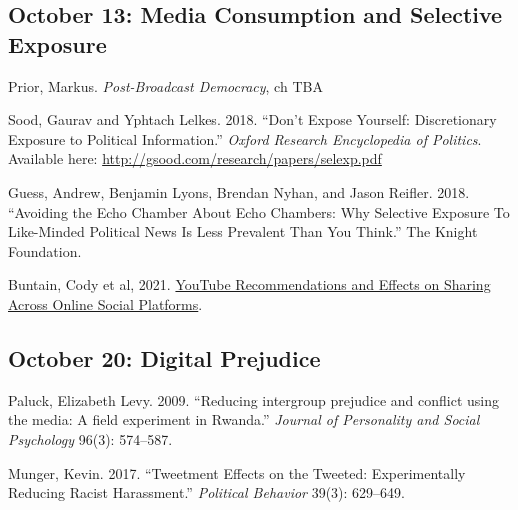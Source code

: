 \vspace{-.1in}\documentclass[11pt]{article}
\begin{document}





\subsection*{October 13: Media Consumption and Selective Exposure}



Prior, Markus. \textit{Post-Broadcast Democracy}, ch TBA


\noindent Sood, Gaurav and Yphtach Lelkes. 2018. ``Don't Expose Yourself: Discretionary Exposure to Political Information.'' \emph{Oxford Research Encyclopedia of Politics}. Available here: \url{http://gsood.com/research/papers/selexp.pdf}

\noindent Guess, Andrew, Benjamin Lyons, Brendan Nyhan, and Jason Reifler. 2018. ``Avoiding the Echo Chamber About Echo Chambers: Why Selective Exposure To Like-Minded Political News Is Less Prevalent Than You Think.'' The Knight Foundation.


\noindent Buntain, Cody et al, 2021. \href{https://dl.acm.org/doi/10.1145/3449085}{YouTube Recommendations and Effects on Sharing Across Online Social Platforms}.
	




\subsection*{October 20: Digital Prejudice }

Paluck, Elizabeth Levy. 2009. ``Reducing intergroup prejudice and conflict using the media: A field experiment in Rwanda.'' \emph{Journal of Personality and Social Psychology} 96(3): 574--587.


\noindent Munger, Kevin. 2017. ``Tweetment Effects on the Tweeted: Experimentally Reducing Racist Harassment.'' \emph{Political Behavior} 39(3): 629--649.
\end{document}
